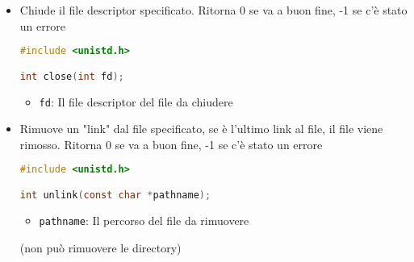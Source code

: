 \documentclass[a4paper]{article}
\begin{document}
\begin{itemize}
\item Chiude il file descriptor specificato. Ritorna 0 se va a buon fine, -1 se c'è
  stato un errore
\begin{lstlisting}[language=C]
#include <unistd.h>

int close(int fd);
\end{lstlisting}
  \begin{itemize}
    \item \texttt{fd}: Il file descriptor del file da chiudere
  \end{itemize}

\item Rimuove un "link" dal file specificato, se è l'ultimo link al file, il file
  viene rimosso. Ritorna 0 se va a buon fine, -1 se c'è stato un errore
\begin{lstlisting}[language=C]
#include <unistd.h>

int unlink(const char *pathname);
\end{lstlisting}
  \begin{itemize}
    \item \texttt{pathname}: Il percorso del file da rimuovere
  \end{itemize}
  (non può rimuovere le directory)

\end{itemize}
\end{document}
